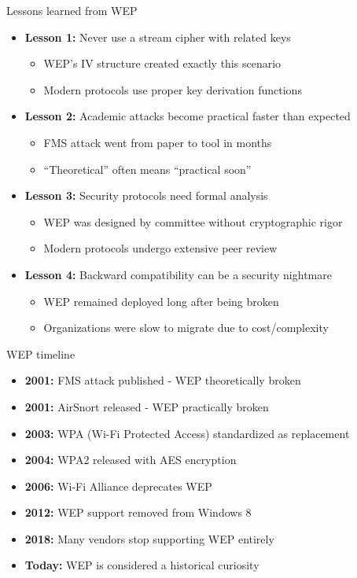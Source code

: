 \documentclass[aspectratio=169, lualatex, handout]{beamer}
\begin{document}
\begin{frame}{Lessons learned from WEP}
	\begin{itemize}
		\item \textbf{Lesson 1:} Never use a stream cipher with related keys
		      \begin{itemize}
			      \item WEP's IV structure created exactly this scenario
			      \item Modern protocols use proper key derivation functions
		      \end{itemize}
		\item \textbf{Lesson 2:} Academic attacks become practical faster than expected
		      \begin{itemize}
			      \item FMS attack went from paper to tool in months
			      \item ``Theoretical'' often means ``practical soon''
		      \end{itemize}
		\item \textbf{Lesson 3:} Security protocols need formal analysis
		      \begin{itemize}
			      \item WEP was designed by committee without cryptographic rigor
			      \item Modern protocols undergo extensive peer review
		      \end{itemize}
		\item \textbf{Lesson 4:} Backward compatibility can be a security nightmare
		      \begin{itemize}
			      \item WEP remained deployed long after being broken
			      \item Organizations were slow to migrate due to cost/complexity
		      \end{itemize}
	\end{itemize}
\end{frame}

\begin{frame}{WEP timeline}
	\begin{itemize}
		\item \textbf{2001:} FMS attack published - WEP theoretically broken
		\item \textbf{2001:} AirSnort released - WEP practically broken
		\item \textbf{2003:} WPA (Wi-Fi Protected Access) standardized as replacement
		\item \textbf{2004:} WPA2 released with AES encryption
		\item \textbf{2006:} Wi-Fi Alliance deprecates WEP
		\item \textbf{2012:} WEP support removed from Windows 8
		\item \textbf{2018:} Many vendors stop supporting WEP entirely
		\item \textbf{Today:} WEP is considered a historical curiosity
	\end{itemize}
\end{frame}
\end{document}

